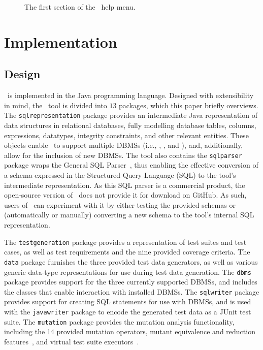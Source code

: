 \begin{figure}

\caption{\label{fig:usage} The first section of the \sa~help menu.}
\end{figure}

\section{Implementation}\label{sec:implementation}
\subsection{Design}


\sa~is implemented in the Java programming language.  Designed with extensibility in mind, the \sa~tool is divided into
$13$ packages, which this paper briefly overviews. The \texttt{sqlrepresentation} package provides an intermediate Java
representation of data structures in relational databases, fully modelling database tables, columns, expressions,
datatypes, integrity constraints, and other relevant entities. These objects enable \sa~to support multiple DBMSs (i.e.,
\sqlite, \postgres, and \hypersql), and, additionally, allow for the inclusion of new DBMSs. The tool also contains the
\texttt{sqlparser} package wraps the General SQL Parser~\cite{generalsqlparser}, thus enabling the effective conversion
of a schema expressed in the Structured Query Language (SQL) to the tool's intermediate representation. As this SQL
parser is a commercial product, the open-source version of \sa~does not provide it for download on GitHub. As such,
users of \sa~can experiment with it by either testing the provided schemas or (automatically or manually) converting a
new schema to the tool's internal SQL representation.


The \texttt{testgeneration} package provides a representation of test suites and test cases, as well as test
requirements and the nine provided coverage criteria.  The \texttt{data} package furnishes the three provided test data
generators, as well as various generic data-type representations for use during test data generation. The \texttt{dbms}
package provides support for the three currently supported DBMSs, and includes the classes that enable interaction with
installed DBMSs. The \texttt{sqlwriter} package provides support for creating SQL statements for use with DBMSs, and is
used with the \texttt{javawriter} package to encode the generated test data as a JUnit test suite.  The
\texttt{mutation} package provides the mutation analysis functionality, including the 14 provided mutation operators,
mutant equivalence and reduction features~\cite{wright2014impact}, and virtual test suite
executors~\cite{mcminn2016virtual}.

